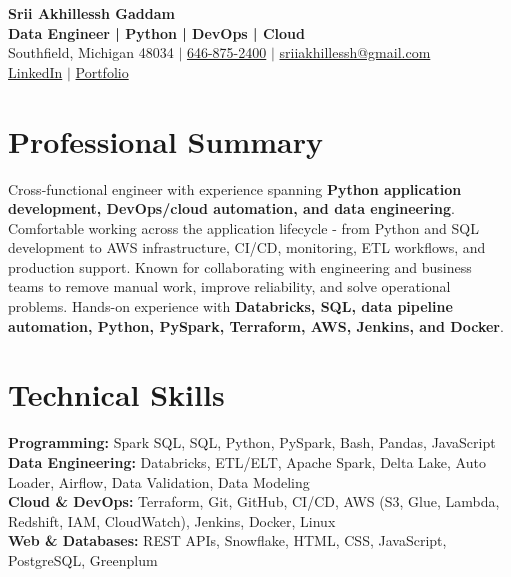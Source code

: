 \documentclass[letterpaper,10pt]{article}
\begin{document}
\fontsize{9.35pt}{10.45pt}\selectfont

\begin{center}
    {\LARGE \textbf{Srii Akhillessh Gaddam}} \\[-1pt]
    \textbf{Data Engineer | Python | DevOps | Cloud} \\[2pt]
    Southfield, Michigan 48034 $|$
    \href{tel:6468752400}{646-875-2400} $|$
    \href{mailto:sriiakhillessh@gmail.com}{sriiakhillessh@gmail.com} \\[1pt]
    \href{https://www.linkedin.com/in/srii-akhiilessh-gaddam-b48668191/}{LinkedIn} $|$
    \href{https://sriiakhillesshg.github.io/portfolio/}{Portfolio}
\end{center}
\vspace{-8pt}

\section{Professional Summary}
\small{Cross-functional engineer with experience spanning \textbf{Python application development, DevOps/cloud automation, and data engineering}. Comfortable working across the application lifecycle - from Python and SQL development to AWS infrastructure, CI/CD, monitoring, ETL workflows, and production support. Known for collaborating with engineering and business teams to remove manual work, improve reliability, and solve operational problems. Hands-on experience with \textbf{Databricks, SQL, data pipeline automation, Python, PySpark, Terraform, AWS, Jenkins, and Docker}.}

\section{Technical Skills}
\small{
\textbf{Programming:} Spark SQL, SQL, Python, PySpark, Bash, Pandas, JavaScript \\
\textbf{Data Engineering:} Databricks, ETL/ELT, Apache Spark, Delta Lake, Auto Loader, Airflow, Data Validation, Data Modeling \\
\textbf{Cloud \& DevOps:} Terraform, Git, GitHub, CI/CD, AWS (S3, Glue, Lambda, Redshift, IAM, CloudWatch), Jenkins, Docker, Linux \\
\textbf{Web \& Databases:} REST APIs, Snowflake, HTML, CSS, JavaScript, PostgreSQL, Greenplum
}

\end{document}
